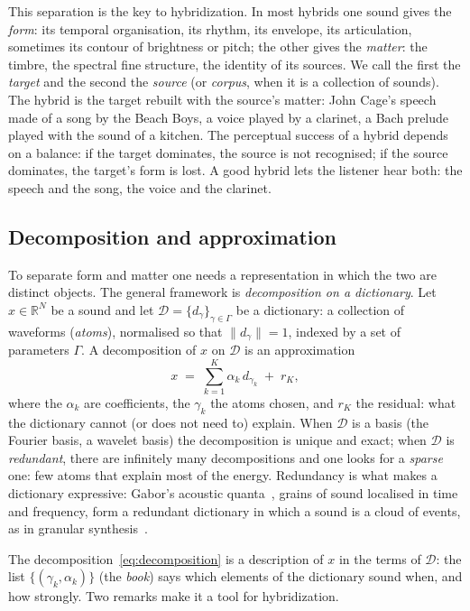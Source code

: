\documentclass[11pt,a4paper]{article}
\newcommand{\R}{\mathbb{R}}
\newcommand{\D}{\mathcal{D}}
\newcommand{\norm}[1]{\lVert #1 \rVert}
\begin{document}
This separation is the key to hybridization. In most hybrids one sound gives
the \emph{form}: its temporal organisation, its rhythm, its envelope, its
articulation, sometimes its contour of brightness or pitch; the other gives
the \emph{matter}: the timbre, the spectral fine structure, the identity of
its sources. We call the first the \emph{target} and the second the
\emph{source} (or \emph{corpus}, when it is a collection of sounds). The
hybrid is the target rebuilt with the source's matter: John Cage's speech
made of a song by the Beach Boys, a voice played by a clarinet, a Bach
prelude played with the sound of a kitchen. The perceptual success of a
hybrid depends on a balance: if the target dominates, the source is not
recognised; if the source dominates, the target's form is lost. A good
hybrid lets the listener hear both: the speech and the song, the voice and
the clarinet.

\subsection{Decomposition and approximation}

To separate form and matter one needs a representation in which the two are
distinct objects. The general framework is \emph{decomposition on a
dictionary}. Let $x \in \R^N$ be a sound and let
$\D = \{ d_\gamma \}_{\gamma \in \Gamma}$ be a dictionary: a collection of
waveforms (\emph{atoms}), normalised so that $\norm{d_\gamma} = 1$, indexed by
a set of parameters $\Gamma$. A decomposition of $x$ on $\D$ is an
approximation
\begin{equation}
  x \;=\; \sum_{k=1}^{K} \alpha_k \, d_{\gamma_k} \;+\; r_K ,
  \label{eq:decomposition}
\end{equation}
where the $\alpha_k$ are coefficients, the $\gamma_k$ the atoms chosen, and
$r_K$ the residual: what the dictionary cannot (or does not need to)
explain. When $\D$ is a basis (the Fourier basis, a wavelet basis) the
decomposition is unique and exact; when $\D$ is \emph{redundant}, there are
infinitely many decompositions and one looks for a \emph{sparse} one: few
atoms that explain most of the energy. Redundancy is what makes a dictionary
expressive: Gabor's acoustic quanta~\cite{gabor1947}, grains of sound
localised in time and frequency, form a redundant dictionary in which a sound
is a cloud of events, as in granular synthesis~\cite{roads2001}.

The decomposition~\eqref{eq:decomposition} is a description of $x$ in the
terms of $\D$: the list $\{(\gamma_k, \alpha_k)\}$ (the \emph{book}) says
which elements of the dictionary sound when, and how strongly. Two remarks
make it a tool for hybridization.
\end{document}
